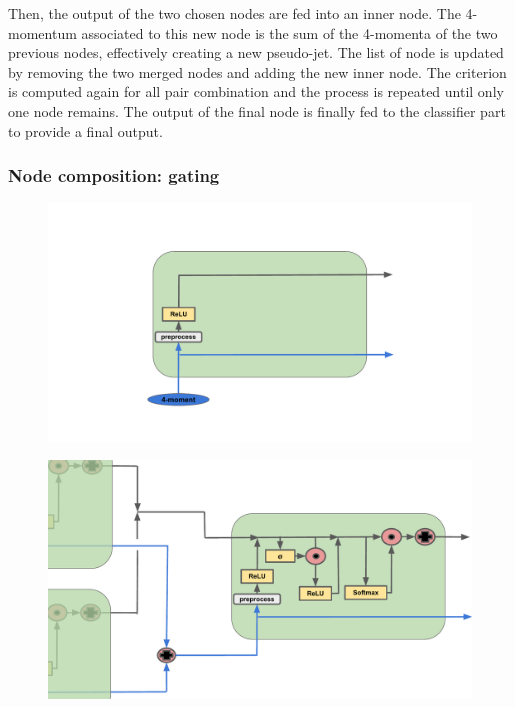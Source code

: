 Then, the output of the two chosen nodes are fed into an inner node. The 4-momentum associated to this new node is the sum of the 4-momenta of the two previous nodes, effectively creating a new pseudo-jet. The list of node is updated by removing the two merged nodes and adding the new inner node. The criterion is computed again for all pair combination and the process is repeated until only one node remains. The output of the final node is finally fed to the classifier part to provide a final output. 


\subsubsection{Node composition: gating}


\begin{figure}
    \begin{center}
        \includegraphics[width=\textwidth]{Images/Schema_RecNN_Leaf.pdf}
        \label{sub:RecNNLeafNode}
    
        \includegraphics[width=\textwidth]{Images/Schema_RecNN.pdf}
        \label{sub:RecNNNode}
    

\end{center}
\end{figure}
